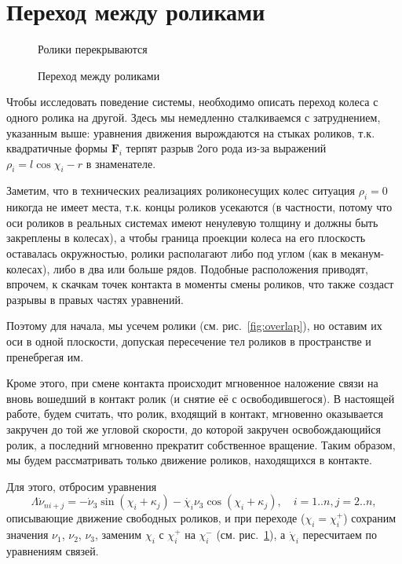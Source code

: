 \section{Переход между роликами}

\begin{figure}
        \centering
        \caption{Ролики перекрываются}
        \label{fig:overlap}
    \endminipage
        \centering
        \caption{Переход между роликами}
        \label{fig:change}
    \endminipage
\end{figure}

Чтобы исследовать поведение системы, необходимо описать переход колеса с одного ролика на другой. Здесь мы немедленно сталкиваемся с затруднением, указанным выше: уравнения движения вырождаются на стыках роликов, т.к. квадратичные формы $\boldsymbol{F}_i$ терпят разрыв 2ого рода из-за выражений $\rho_i = l\cos\chi_i-r$ в знаменателе.

Заметим, что в технических реализациях роликонесущих колес ситуация $\rho_i = 0$ никогда не имеет места, т.к. концы роликов усекаются (в частности, потому что оси роликов в реальных системах имеют ненулевую толщину и должны быть закреплены в колесах), а чтобы граница проекции колеса на его плоскость оставалась окружностью, ролики располагают либо под углом (как в меканум-колесах), либо в два или больше рядов. Подобные расположения приводят, впрочем, к скачкам точек контакта в моменты смены роликов, что также создаст разрывы в правых частях уравнений.

Поэтому для начала, мы усечем ролики (см. рис.~\ref{fig:overlap}), но оставим их оси в одной плоскости, допуская пересечение тел роликов в пространстве и пренебрегая им.

Кроме этого, при смене контакта происходит мгновенное наложение связи на вновь вошедший в контакт ролик (и снятие её с освободившегося). В настоящей работе, будем считать, что ролик, входящий в контакт, мгновенно оказывается закручен до той же угловой скорости, до которой закручен освобождающийся ролик, а последний мгновенно прекратит собственное вращение. Таким образом, мы будем рассматривать только движение роликов, находящихся в контакте.

Для этого, отбросим уравнения
$$
\Lambda\dot{\nu}_{ni+j} = -\dot{\nu}_3\sin(\chi_i+\kappa_j) - \dot{\chi_i}\nu_3\cos(\chi_i+\kappa_j), \quad i = 1..n, j = 2..n,
$$
описывающие движение свободных роликов, и при переходе ($\chi_i = \chi_i^+$) сохраним значения $\nu_1$, $\nu_2$, 
$\nu_3$, заменим $\chi_i$ с $\chi_i^+$ на $\chi_i^-$ (см. рис.~\ref{fig:change}), а $\dot\chi_i$ пересчитаем по уравнениям связей.
